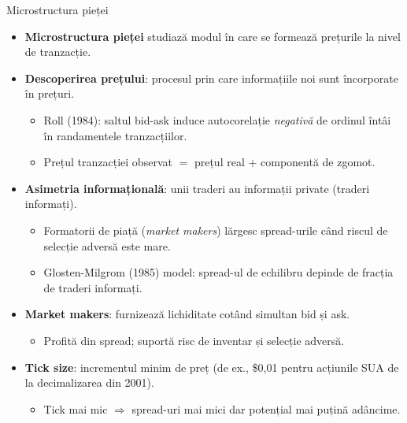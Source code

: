 \documentclass[9pt, aspectratio=169, t]{beamer}
\theoremstyle{definition}
\begin{document}
\begin{frame}{Microstructura pieței}
\begin{itemize}
    \item \textbf{Microstructura pieței} studiază modul în care se formează prețurile la nivel de tranzacție.
    \item \textbf{Descoperirea prețului}: procesul prin care informațiile noi sunt încorporate în prețuri.
    \begin{itemize}
        \item Roll (1984): saltul bid-ask induce autocorelație \textit{negativă} de ordinul întâi în randamentele tranzacțiilor.
        \item Prețul tranzacției observat $= $ prețul real $+$ componentă de zgomot.
    \end{itemize}
    \item \textbf{Asimetria informațională}: unii traderi au informații private (traderi informați).
    \begin{itemize}
        \item Formatorii de piață (\textit{market makers}) lărgesc spread-urile când riscul de selecție adversă este mare.
        \item Glosten-Milgrom (1985) model: spread-ul de echilibru depinde de fracția de traderi informați.
    \end{itemize}
    \item \textbf{Market makers}: furnizează lichiditate cotând simultan bid și ask.
    \begin{itemize}
        \item Profită din spread; suportă risc de inventar și selecție adversă.
    \end{itemize}
    \item \textbf{Tick size}: incrementul minim de preț (de ex., \$0,01 pentru acțiunile SUA de la decimalizarea din 2001).
    \begin{itemize}
        \item Tick mai mic $\Rightarrow$ spread-uri mai mici dar potențial mai puțină adâncime.
    \end{itemize}
\end{itemize}
\end{frame}
\end{document}
